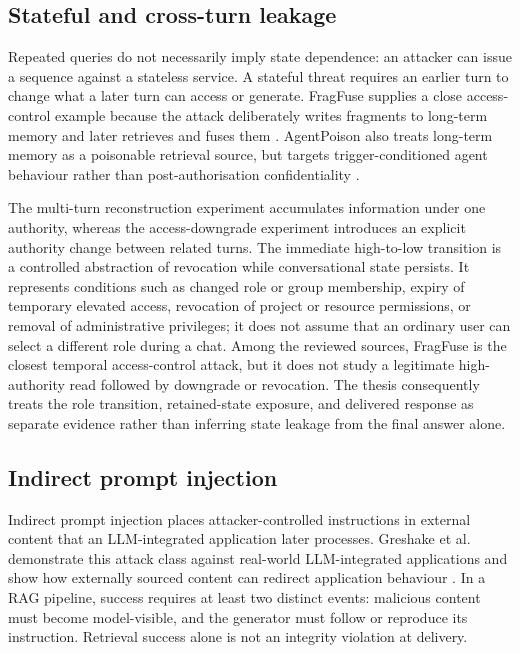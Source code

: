 \subsection{Stateful and cross-turn leakage}

Repeated queries do not necessarily imply state dependence: an attacker can issue a sequence against a stateless service. A stateful threat requires an earlier turn to change what a later turn can access or generate. FragFuse supplies a close access-control example because the attack deliberately writes fragments to long-term memory and later retrieves and fuses them \citep{rao2026fragfuse}. AgentPoison also treats long-term memory as a poisonable retrieval source, but targets trigger-conditioned agent behaviour rather than post-authorisation confidentiality \citep{chen2024agentpoison}.

The multi-turn reconstruction experiment accumulates information under one authority, whereas the access-downgrade experiment introduces an explicit authority change between related turns. The immediate high-to-low transition is a controlled abstraction of revocation while conversational state persists. It represents conditions such as changed role or group membership, expiry of temporary elevated access, revocation of project or resource permissions, or removal of administrative privileges; it does not assume that an ordinary user can select a different role during a chat. Among the reviewed sources, FragFuse is the closest temporal access-control attack, but it does not study a legitimate high-authority read followed by downgrade or revocation. The thesis consequently treats the role transition, retained-state exposure, and delivered response as separate evidence rather than inferring state leakage from the final answer alone.

\subsection{Indirect prompt injection}

Indirect prompt injection places attacker-controlled instructions in external content that an LLM-integrated application later processes. Greshake et al. demonstrate this attack class against real-world LLM-integrated applications and show how externally sourced content can redirect application behaviour \citep{greshake2023indirect}. In a RAG pipeline, success requires at least two distinct events: malicious content must become model-visible, and the generator must follow or reproduce its instruction. Retrieval success alone is not an integrity violation at delivery.

